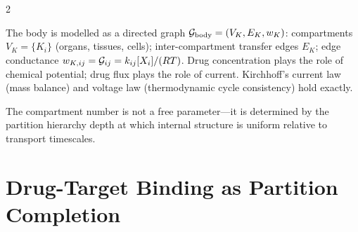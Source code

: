 \begin{multicols}{2}
\begin{definition}
\label{def:ch12_graph}
The body is modelled as a directed graph $\mathcal{G}_{\mathrm{body}} = (V_K, E_K, w_K)$: compartments $V_K = \{K_i\}$ (organs, tissues, cells); inter-compartment transfer edges $E_K$; edge conductance $w_{K,ij} = \mathcal{G}_{ij} = k_{ij}[X_i]/(RT)$. Drug concentration plays the role of chemical potential; drug flux plays the role of current. Kirchhoff's current law (mass balance) and voltage law (thermodynamic cycle consistency) hold exactly.
\end{definition}

The compartment number is not a free parameter---it is determined by the partition hierarchy depth at which internal structure is uniform relative to transport timescales.

\end{multicols}

\section{Drug-Target Binding as Partition Completion}
\label{sec:ch12_binding}

